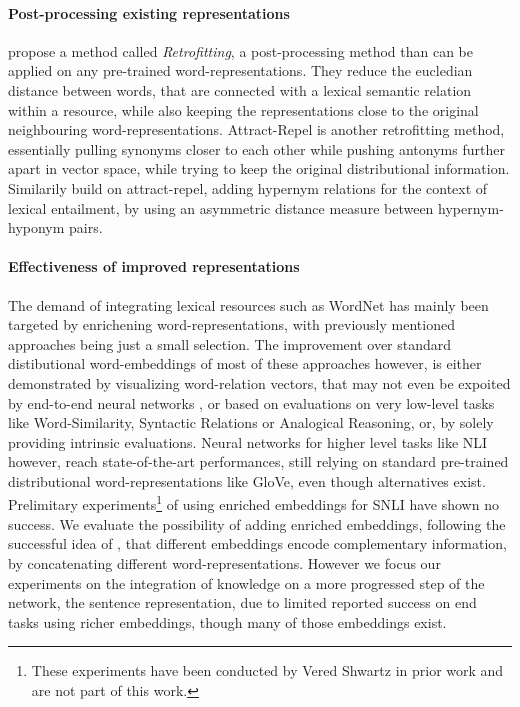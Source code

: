 \paragraph*{Post-processing existing representations}
 \cite{faruqui2015retrofitting} propose a method called \textit{Retrofitting}, a post-processing method than can be applied on any pre-trained word-representations. They reduce the eucledian distance between words, that are connected with a lexical semantic relation within a resource, while also keeping the representations close to the original neighbouring word-representations. Attract-Repel \citep{mrkvsic2017semantic} is another retrofitting method, essentially pulling synonyms closer to each other while pushing antonyms further apart in vector space, while trying to keep the original distributional information. Similarily \cite{vulic2017specialising} build on attract-repel, adding hypernym relations for the context of lexical entailment, by using an asymmetric distance measure between hypernym-hyponym pairs.
 
\paragraph*{Effectiveness of improved representations}
The demand of integrating lexical resources such as WordNet has mainly been targeted by enrichening word-representations, with previously mentioned approaches being just a small selection. The improvement over standard distibutional word-embeddings of most of these approaches however, is either demonstrated by visualizing word-relation vectors, that may not even be expoited by end-to-end neural networks \citep{levy2015improving}, or based on evaluations on very low-level tasks like Word-Similarity, Syntactic Relations or Analogical Reasoning, or, by solely providing intrinsic evaluations. Neural networks for higher level tasks like \ac{NLI} however, reach state-of-the-art performances, still relying on standard pre-trained distributional word-representations like GloVe, even though alternatives exist. Prelimitary experiments\footnote{These experiments have been conducted by Vered Shwartz in prior work and are not part of this work.} of using enriched embeddings for \ac{SNLI} have shown no success. We evaluate the possibility of adding enriched embeddings, following the successful idea of \cite{ruckle2018concatenated}, that different embeddings encode complementary information, by concatenating different word-representations. However we focus our experiments on the integration of knowledge on a more progressed step of the network, the sentence representation, due to limited reported success on end tasks using richer embeddings, though many of those embeddings exist.
